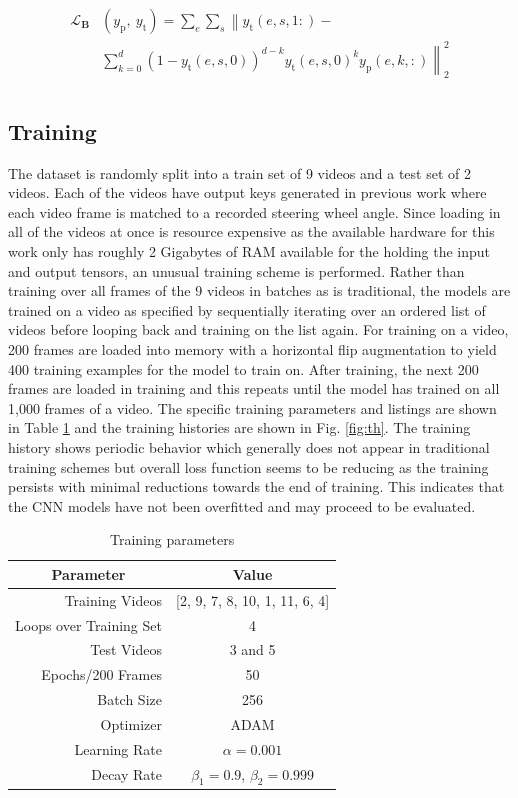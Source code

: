 \documentclass[conference]{IEEEtran}
\begin{document}
\begin{equation}
\label{eq:bl}
\begin{split}
\mathcal{L}_\mathbf{B}&(y_{\text{p}},\ y_{\text{t}}) = \sum_{e} \sum_{s} \left\| y_{\text{t}}(e,s,1:) -  \right. \\
&\left. \sum_{k=0}^d (1 - y_{\text{t}}(e,s,0))^{d-k} y_{\text{t}}(e,s,0)^k y_{\text{p}}(e,k,:) \right\|_2^2\\
\end{split}
\end{equation}

\subsection{Training}

The dataset is randomly split into a train set of 9 videos and a test set of 2 videos. Each of the videos have output keys generated in previous work where each video frame is matched to a recorded steering wheel angle. Since loading in all of the videos at once is resource expensive as the available hardware for this work only has roughly 2 Gigabytes of RAM available for the holding the input and output tensors, an unusual training scheme is performed. Rather than training over all frames of the 9 videos in batches as is traditional, the models are trained on a video as specified by sequentially iterating over an ordered list of videos before looping back and training on the list again. For training on a video, 200 frames are loaded into memory with a horizontal flip augmentation to yield 400 training examples for the model to train on. After training, the next 200 frames are loaded in training and this repeats until the model has trained on all 1,000 frames of a video. The specific training parameters and listings are shown in Table \ref{tab:training-parameters} and the training histories are shown in Fig. \ref{fig:th}. The training history shows periodic behavior which generally does not appear in traditional training schemes but overall loss function seems to be reducing as the training persists with minimal reductions towards the end of training. This indicates that the CNN models have not been overfitted and may proceed to be evaluated.

\begin{table}[btp]
	\centering
	\caption{Training parameters}
	\begin{tabular}{|r|c|}
	\multicolumn{1}{c}{\textbf{Parameter}} & \multicolumn{1}{c}{\textbf{Value}} \\\hline
	Training Videos & [2, 9, 7, 8, 10, 1, 11, 6, 4] \\
	Loops over Training Set & 4\\
	Test Videos & 3 and 5 \\
	Epochs/200 Frames & 50 \\
	Batch Size & 256 \\
	Optimizer & ADAM \\
	Learning Rate & $\alpha=0.001$ \\
	Decay Rate & $\beta_1 = 0.9$, $\beta_2=0.999$ \\ \hline
	\end{tabular}
	\label{tab:training-parameters}
\end{table}
\end{document}
